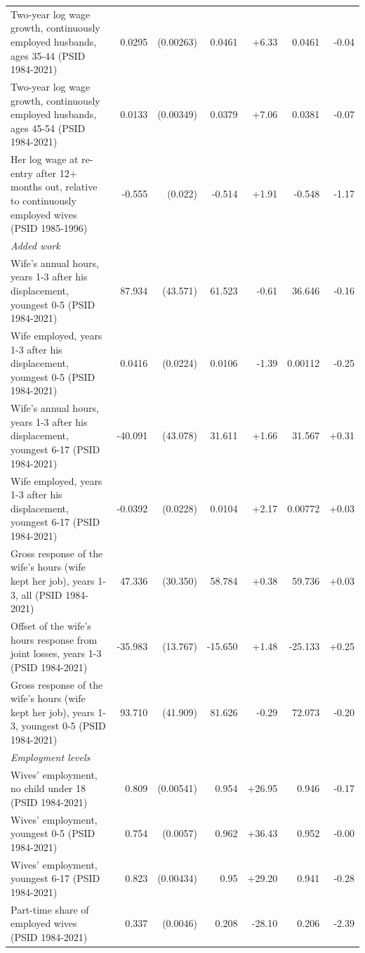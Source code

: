 {\begin{longtable}{p{6.4cm}rrrrrr}
Two-year log wage growth, continuously employed husbands, ages 35-44 (PSID 1984-2021) & 0.0295 & (0.00263) & 0.0461 & +6.33 & 0.0461 & -0.04 \\
Two-year log wage growth, continuously employed husbands, ages 45-54 (PSID 1984-2021) & 0.0133 & (0.00349) & 0.0379 & +7.06 & 0.0381 & -0.07 \\
Her log wage at re-entry after 12+ months out, relative to continuously employed wives (PSID 1985-1996) & -0.555 & (0.022) & -0.514 & +1.91 & -0.548 & -1.17 \\
\multicolumn{7}{l}{\textit{Added work}} \\
Wife's annual hours, years 1-3 after his displacement, youngest 0-5 (PSID 1984-2021) & 87.934 & (43.571) & 61.523 & -0.61 & 36.646 & -0.16 \\
Wife employed, years 1-3 after his displacement, youngest 0-5 (PSID 1984-2021) & 0.0416 & (0.0224) & 0.0106 & -1.39 & 0.00112 & -0.25 \\
Wife's annual hours, years 1-3 after his displacement, youngest 6-17 (PSID 1984-2021) & -40.091 & (43.078) & 31.611 & +1.66 & 31.567 & +0.31 \\
Wife employed, years 1-3 after his displacement, youngest 6-17 (PSID 1984-2021) & -0.0392 & (0.0228) & 0.0104 & +2.17 & 0.00772 & +0.03 \\
Gross response of the wife's hours (wife kept her job), years 1-3, all (PSID 1984-2021) & 47.336 & (30.350) & 58.784 & +0.38 & 59.736 & +0.03 \\
Offset of the wife's hours response from joint losses, years 1-3 (PSID 1984-2021) & -35.983 & (13.767) & -15.650 & +1.48 & -25.133 & +0.25 \\
Gross response of the wife's hours (wife kept her job), years 1-3, youngest 0-5 (PSID 1984-2021) & 93.710 & (41.909) & 81.626 & -0.29 & 72.073 & -0.20 \\
\multicolumn{7}{l}{\textit{Employment levels}} \\
Wives' employment, no child under 18 (PSID 1984-2021) & 0.809 & (0.00541) & 0.954 & +26.95 & 0.946 & -0.17 \\
Wives' employment, youngest 0-5 (PSID 1984-2021) & 0.754 & (0.0057) & 0.962 & +36.43 & 0.952 & -0.00 \\
Wives' employment, youngest 6-17 (PSID 1984-2021) & 0.823 & (0.00434) & 0.95 & +29.20 & 0.941 & -0.28 \\
Part-time share of employed wives (PSID 1984-2021) & 0.337 & (0.0046) & 0.208 & -28.10 & 0.206 & -2.39 \\

\end{longtable}}
